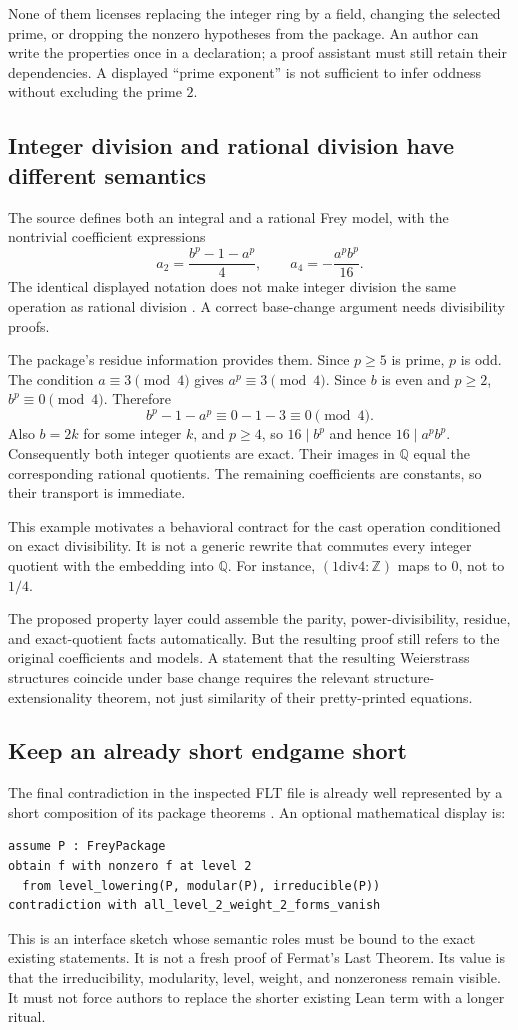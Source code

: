\documentclass[11pt,a4paper]{article}
\theoremstyle{definition}
\theoremstyle{remark}
\newcommand{\Q}{\mathbb Q}
\newcommand{\Z}{\mathbb Z}
\begin{document}
None of them licenses replacing the integer ring by a field, changing the selected prime, or dropping the nonzero hypotheses from the package. An author can write the properties once in a declaration; a proof assistant must still retain their dependencies. A displayed ``prime exponent'' is not sufficient to infer oddness without excluding the prime $2$.

\subsection{Integer division and rational division have different semantics}
The source defines both an integral and a rational Frey model, with the nontrivial coefficient expressions
\[
 a_2=\frac{b^p-1-a^p}{4},\qquad
 a_4=-\frac{a^pb^p}{16}.
\]
The identical displayed notation does not make integer division the same operation as rational division \cite{freyDef}. A correct base-change argument needs divisibility proofs.

The package's residue information provides them. Since $p\ge5$ is prime, $p$ is odd. The condition $a\equiv3\pmod4$ gives $a^p\equiv3\pmod4$. Since $b$ is even and $p\ge2$, $b^p\equiv0\pmod4$. Therefore
\[
 b^p-1-a^p\equiv0-1-3\equiv0\pmod4.
\]
Also $b=2k$ for some integer $k$, and $p\ge4$, so $16\mid b^p$ and hence $16\mid a^pb^p$. Consequently both integer quotients are exact. Their images in $\Q$ equal the corresponding rational quotients. The remaining coefficients are constants, so their transport is immediate.

This example motivates a behavioral contract for the cast operation conditioned on exact divisibility. It is not a generic rewrite that commutes every integer quotient with the embedding into $\Q$. For instance, $(1\mathbin{\mathrm{div}}4:\Z)$ maps to $0$, not to $1/4$.

The proposed property layer could assemble the parity, power-divisibility, residue, and exact-quotient facts automatically. But the resulting proof still refers to the original coefficients and models. A statement that the resulting Weierstrass structures coincide under base change requires the relevant structure-extensionality theorem, not just similarity of their pretty-printed equations.

\subsection{Keep an already short endgame short}
The final contradiction in the inspected FLT file is already well represented by a short composition of its package theorems \cite{freyEnd}. An optional mathematical display is:
\begin{lstlisting}
assume P : FreyPackage
obtain f with nonzero f at level 2
  from level_lowering(P, modular(P), irreducible(P))
contradiction with all_level_2_weight_2_forms_vanish
\end{lstlisting}
This is an interface sketch whose semantic roles must be bound to the exact existing statements. It is not a fresh proof of Fermat's Last Theorem. Its value is that the irreducibility, modularity, level, weight, and nonzeroness remain visible. It must not force authors to replace the shorter existing Lean term with a longer ritual.
\end{document}
